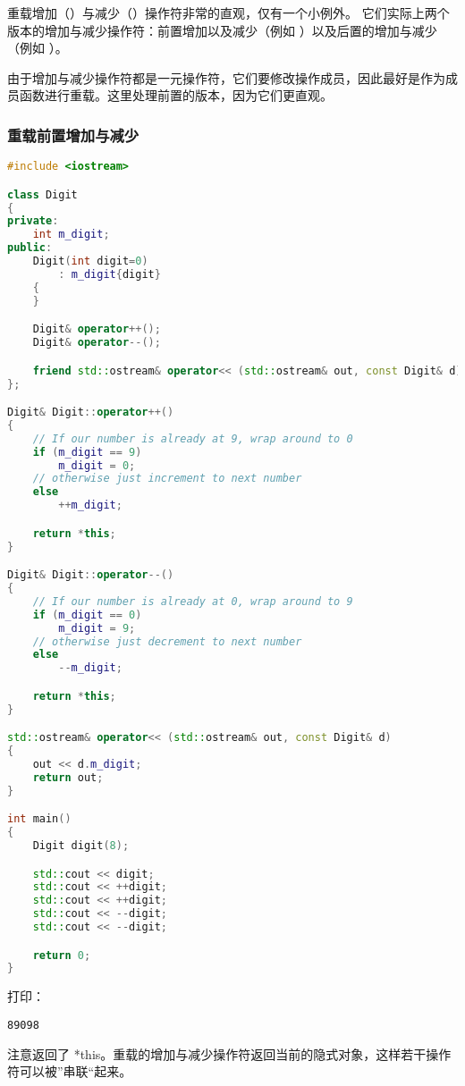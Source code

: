 \documentclass[../../LearnCpp.tex]{subfiles}
\begin{document}

重载增加（\acode{++}）与减少（\acode{--}）操作符非常的直观，仅有一个小例外。
它们实际上两个版本的增加与减少操作符：前置增加以及减少（例如 ）以及后置的增加与减少（例如 ）。

由于增加与减少操作符都是一元操作符，它们要修改操作成员，因此最好是作为成员函数进行重载。这里处理前置的版本，因为它们更直观。

\subsubsection*{重载前置增加与减少}

\begin{lstlisting}[language=C++]
#include <iostream>

class Digit
{
private:
    int m_digit;
public:
    Digit(int digit=0)
        : m_digit{digit}
    {
    }

    Digit& operator++();
    Digit& operator--();

    friend std::ostream& operator<< (std::ostream& out, const Digit& d);
};

Digit& Digit::operator++()
{
    // If our number is already at 9, wrap around to 0
    if (m_digit == 9)
        m_digit = 0;
    // otherwise just increment to next number
    else
        ++m_digit;

    return *this;
}

Digit& Digit::operator--()
{
    // If our number is already at 0, wrap around to 9
    if (m_digit == 0)
        m_digit = 9;
    // otherwise just decrement to next number
    else
        --m_digit;

    return *this;
}

std::ostream& operator<< (std::ostream& out, const Digit& d)
{
	out << d.m_digit;
	return out;
}

int main()
{
    Digit digit(8);

    std::cout << digit;
    std::cout << ++digit;
    std::cout << ++digit;
    std::cout << --digit;
    std::cout << --digit;

    return 0;
}
\end{lstlisting}

打印：

\begin{lstlisting}
89098
\end{lstlisting}

注意返回了 *this。重载的增加与减少操作符返回当前的隐式对象，这样若干操作符可以被”串联“起来。
\end{document}
